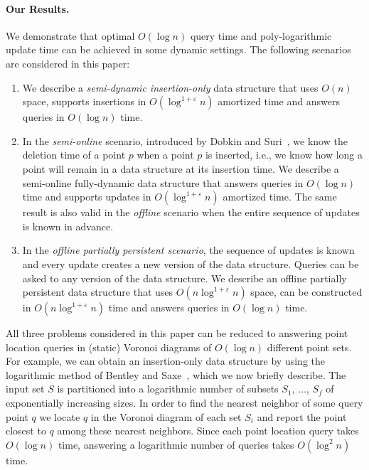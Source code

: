 \documentclass[12pt,a4paper,USenglish,cleveref, autoref, thm-restate]{article}
\newcommand{\eps}{\varepsilon}
\newcommand{\eps}{\varepsilon}
\newcommand{\eps}{\varepsilon}
\begin{document}
\paragraph*{Our Results.}
We demonstrate that optimal $O(\log n)$ query time and poly-logarithmic update time can be achieved in some dynamic settings. The following scenarios are considered in this paper:
\begin{enumerate}
\item  We describe a \emph{semi-dynamic insertion-only} data structure that uses $O(n)$ space, supports insertions in $O(\log^{1+\eps}n)$ amortized time and answers queries in $O(\log n)$ time.
\item 
  In the \emph{semi-online} scenario, introduced by Dobkin and Suri~\cite{DobkinS91}, we know the deletion time of a point $p$ when a  point $p$ is inserted, i.e., we know how long a point will remain in a data structure at its insertion time.
  We describe a semi-online fully-dynamic data structure that answers queries in $O(\log n)$ time and supports updates in $O(\log^{1+\eps} n)$ amortized time. The same result is also valid in the \emph{offline} scenario when the entire sequence of updates is known in advance.
\item
  In the \emph{offline partially persistent scenario}, the sequence of updates is known and every update creates a new version of the data structure.  Queries can be asked to any version of the data structure. We describe an offline partially persistent data structure that uses $O(n\log^{1+\eps}n)$ space, can be constructed in $O(n\log^{1+\eps}n)$ time and answers queries in $O(\log n)$ time.    
\end{enumerate}

All three problems considered in this paper can be reduced to answering point location queries in (static) Voronoi diagrams of $O(\log n)$ different point sets.
For example, we can obtain an insertion-only data structure by using the logarithmic method of Bentley and Saxe~\cite{BentleyS80}, which we now briefly describe.
The input set $S$  is partitioned into a logarithmic number of subsets $S_1$, $\ldots$, $S_f$ of exponentially increasing sizes.
In order to find the nearest neighbor of some query point $q$ we locate $q$ in the Voronoi diagram of each set $S_i$ and report the point closest to $q$ among these nearest neighbors.
Since each  point location query takes $O(\log n)$ time, answering a logarithmic number of queries takes  $O(\log^2 n)$ time.   
\end{document}
